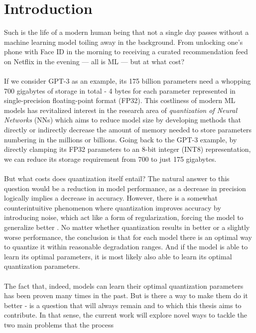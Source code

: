 \chapter{Introduction\label{cha:chapter1}}

Such is the life of a modern human being that not a single day passes 
without a machine learning model toiling away in the background. 
From unlocking one's phone with Face ID in the morning 
to receiving a curated recommendation feed on Netflix in the evening — 
all is ML — but at what cost?
\\
\\
If we consider GPT-3 as an example, 
its 175 billion parameters need a whopping 700 gigabytes of storage in total - 
4 bytes for each parameter represented in single-precision floating-point format (FP32).
This costliness of modern ML models has revitalized interest in the research area
of \textit{quantization of Neural Networks} (NNs) 
which aims to reduce model size by developing methods 
that directly or indirectly decrease the amount of memory 
needed to store parameters numbering in the millions or billions. 
Going back to the GPT-3 example, by directly clamping its FP32 parameters 
to an 8-bit integer (INT8) representation, we can reduce its storage requirement 
from 700 to just 175 gigabytes. 
\\
\\
But what costs does quantization itself entail? The natural answer to this question 
would be a reduction in model performance, as a decrease in precision logically implies 
a decrease in accuracy. However, there is a somewhat counterintuitive phenomenon where 
quantization improves accuracy by introducing noise, which act like a
form of regularization, forcing the model to generalize better \cite{courbariaux2015binaryconnect}. No matter whether quantization
results in better or a slightly worse performance, the conclusion is that 
for each model there is an optimal way to quantize it within reasonable degradation ranges.
And if the model is able to learn its optimal parameters, 
it is most likely also able to learn its optimal quantization parameters. 
\\
\\
The fact that, indeed, models can learn their optimal quantization parameters has been proven 
many times in the past. But is there a way to make them do it better - is a question 
that will always remain and to which this thesis aims to contribute. In that sense, 
the current work will explore novel ways to tackle the two main problems that the process 
